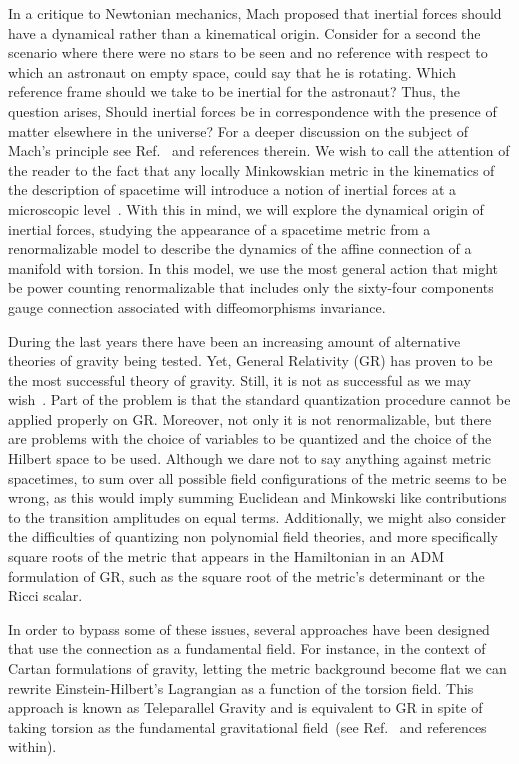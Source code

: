 \documentclass[twocolumn,aps,
  showpacs,showkeys,prd,superscriptaddress]{revtex4-1}
\begin{document}
In a critique to Newtonian mechanics, Mach proposed that inertial forces should have a dynamical rather than a kinematical origin. Consider for a second the scenario where there were no stars to be seen and no reference with respect to which an astronaut on empty space, could say that he is rotating. Which reference frame should we take to be inertial for the astronaut?  Thus, the question arises, Should inertial forces  be in correspondence with the presence of matter elsewhere in the universe? For a deeper discussion on the subject of Mach's principle see Ref.~\cite{Lichtenegger:2004re} and references therein.  We wish to call the attention of the reader to the fact that any locally Minkowskian metric in the kinematics of the description of spacetime will introduce a notion of inertial forces at a microscopic level~\cite{Sciama:1964wt}. With this in mind, we will explore the dynamical origin of inertial forces, studying the appearance of a spacetime metric from a renormalizable model to describe the dynamics of the affine connection of a manifold with torsion. In this model, we use the most general action that might be power counting renormalizable that includes only the sixty-four components gauge connection associated with diffeomorphisms invariance.

During the last years there have been an increasing amount of alternative theories of gravity being tested. Yet, General Relativity (GR) has proven to be the most successful theory of gravity.  Still,  it is not as successful as we may wish~\cite{Kiefer:2013jqa}. Part of the problem is that the standard quantization procedure cannot be applied  properly on GR. Moreover, not only it is not renormalizable, but there are  problems with the choice of variables to be quantized and the choice of the Hilbert space to be used. Although we dare not to say anything against metric spacetimes, to sum over all possible field configurations of the metric seems to be wrong, as this would imply summing Euclidean and Minkowski like contributions to the transition amplitudes on equal terms. Additionally, we might also consider the difficulties of  quantizing  non polynomial field theories, and more specifically square roots of the metric that appears in the Hamiltonian in an ADM formulation of GR, such as the square root of the metric's determinant or the Ricci scalar.

In order to bypass some of these issues, several approaches have been designed that use the connection as a fundamental field. For instance, in the context of Cartan formulations of gravity, letting the metric background become flat we can rewrite Einstein-Hilbert's Lagrangian as a function of the torsion field. This approach is known as Teleparallel Gravity and is equivalent to GR in spite of taking torsion as the fundamental gravitational field~(see Ref.~\cite{Teleparallel,Baez:2012bn} and references within).
\end{document}
